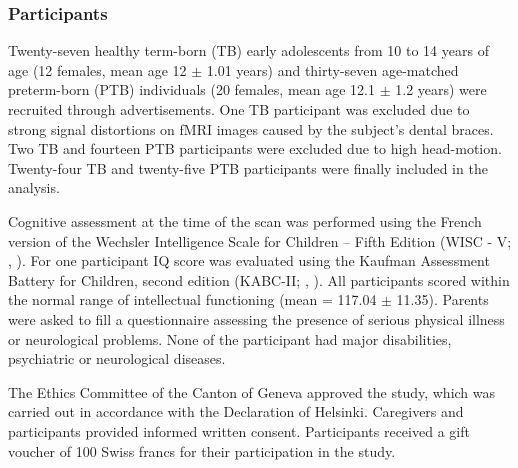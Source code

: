 \subsubsection{Participants} 
Twenty-seven healthy term-born (TB) early adolescents from 10 to 14 years of age (12 females, mean age 12 $\pm$ 1.01 years) and thirty-seven age-matched preterm-born (PTB) individuals (20 females, mean age 12.1 $\pm$ 1.2 years) were recruited through advertisements. One TB participant was excluded due to strong signal distortions on fMRI images caused by the subject’s dental braces. Two TB and fourteen PTB participants were excluded due to high head-motion. Twenty-four TB and twenty-five PTB participants were finally included in the analysis.

Cognitive assessment at the time of the scan was performed using the French version of the Wechsler Intelligence Scale for Children – Fifth Edition (WISC - V; \citeauthor{Wechsler2014}, \citeyear{Wechsler2014}). For one participant IQ score was evaluated using the Kaufman Assessment Battery for Children, second edition (KABC-II; \citeauthor{Kaufman2004}, \citeyear{Kaufman2004}). All participants scored within the normal range of intellectual functioning (mean = 117.04 $\pm$ 11.35). Parents were asked to fill a questionnaire assessing the presence of serious physical illness or neurological problems. None of the participant had major disabilities, psychiatric or neurological diseases.

The Ethics Committee of the Canton of Geneva approved the study, which was carried out in accordance with the Declaration of Helsinki. Caregivers and participants provided informed written consent. Participants received a gift voucher of 100 Swiss francs for their participation in the study. 


